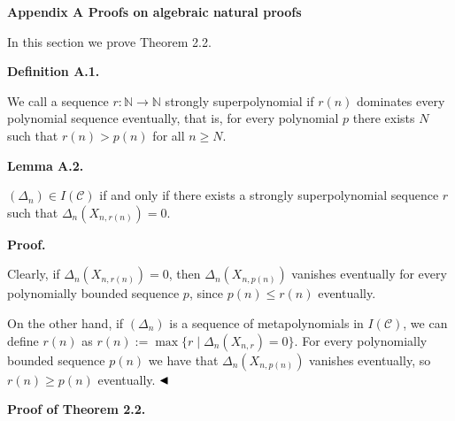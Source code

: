 

\par\medskip\noindent\textbf{Appendix A Proofs on algebraic natural proofs}\par




In this section we prove Theorem 2.2.





\par\medskip\noindent\textbf{Definition A.1.}\par



We call a sequence $r\colon\mathbb{N}\to\mathbb{N}$ strongly superpolynomial if $r(n)$ dominates every polynomial sequence eventually, that is, for every polynomial $p$ there exists $N$ such that $r(n)>p(n)$ for all $n\geq N$.






\par\medskip\noindent\textbf{Lemma A.2.}\par



$(\Delta_{n})\in I(\mathcal{C})$ if and only if there exists a strongly superpolynomial sequence $r$ such that $\Delta_{n}(X_{n,r(n)})=0$.






\par\medskip\noindent\textbf{Proof.}\par




Clearly, if $\Delta_{n}(X_{n,r(n)})=0$, then $\Delta_{n}(X_{n,p(n)})$ vanishes eventually for every polynomially bounded sequence $p$, since $p(n)\leq r(n)$ eventually.





On the other hand, if $(\Delta_{n})$ is a sequence of metapolynomials in $I(\mathcal{C})$, we can define $r(n)$ as $r(n):=\max\{r\mid\Delta_{n}(X_{n,r})=0\}$.
For every polynomially bounded sequence $p(n)$ we have that $\Delta_{n}(X_{n,p(n)})$ vanishes eventually, so $r(n)\geq p(n)$ eventually.
$\hfill\blacktriangleleft$






\par\medskip\noindent\textbf{Proof of Theorem 2.2.}\par




